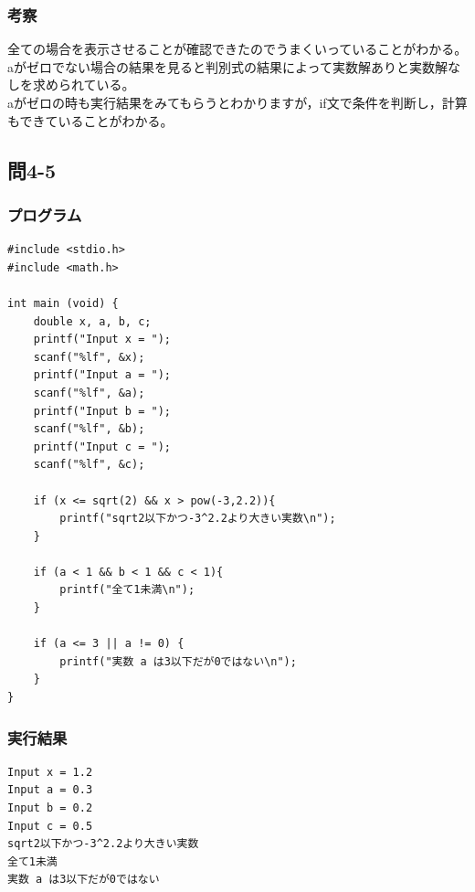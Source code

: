 \documentclass{jarticle}
\begin{document}
\subsubsection{考察\\}
全ての場合を表示させることが確認できたのでうまくいっていることがわかる。\\
aがゼロでない場合の結果を見ると判別式の結果によって実数解ありと実数解なしを求められている。\\
aがゼロの時も実行結果をみてもらうとわかりますが，if文で条件を判断し，計算もできていることがわかる。\\


\subsection{問4-5\\}
\subsubsection{プログラム\\}
\begin{breakbox}
\begin{verbatim}
#include <stdio.h>
#include <math.h>

int main (void) { 
    double x, a, b, c;
    printf("Input x = ");
    scanf("%lf", &x);
    printf("Input a = ");
    scanf("%lf", &a);
    printf("Input b = ");
    scanf("%lf", &b);
    printf("Input c = ");
    scanf("%lf", &c);

    if (x <= sqrt(2) && x > pow(-3,2.2)){
        printf("sqrt2以下かつ-3^2.2より大きい実数\n");
    }

    if (a < 1 && b < 1 && c < 1){
        printf("全て1未満\n");
    }

    if (a <= 3 || a != 0) {
        printf("実数 a は3以下だが0ではない\n");
    }
}
\end{verbatim}
\end{breakbox}
\subsubsection{実行結果\\}
\begin{breakbox}
\begin{verbatim}
Input x = 1.2
Input a = 0.3
Input b = 0.2
Input c = 0.5
sqrt2以下かつ-3^2.2より大きい実数
全て1未満
実数 a は3以下だが0ではない
\end{verbatim}
\end{breakbox}
\end{document}
